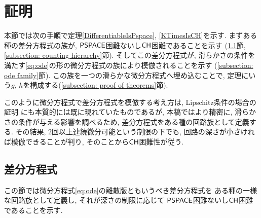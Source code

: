\section{証明}
\label{section:differentiable}

本節では次の手順で定理\ref{DifferentiableIsPspace}, \ref{KTimesIsCH}を示す. 
まずある種の差分方程式の族が, 
$\mathsf{PSPACE}$困難ないし$\mathsf{CH}$困難であることを示す
(\ref{section:divp}節, \ref{subsection: counting hierarchy}節).
そしてこの差分方程式が, 
滑らかさの条件を満たす\eqref{eq:ode}の形の微分方程式の族により模倣されることを示す
(\ref{subsection: ode family}節). 
この族を一つの滑らかな微分方程式へ埋め込むことで, 
定理にいう$g$, $h$を構成する(\ref{subsection: proof of theorems}節).

このように微分方程式で差分方程式を模倣する考え方は, 
Lipschitz条件の場合の証明
\cite{kawamura2010lipschitz}にも本質的には既に現れていたものであるが, 
本稿ではより精密に, 滑らかさの条件が与える影響を調べるため, 
差分方程式をある種の回路族として定義する. 
その結果, 
$2$回以上連続微分可能という制限の下でも, 
回路の深さが小さければ模倣できることが判り, 
そのことから$\mathsf{CH}$困難性が従う. 

\subsection{差分方程式}
\label{section:divp}

この節では微分方程式\eqref{eq:ode}の離散版ともいうべき差分方程式を
ある種の一様な回路族として定義し, 
それが深さの制限に応じて
$\mathsf{PSPACE}$困難ないし$\mathsf{CH}$困難であることを示す.


